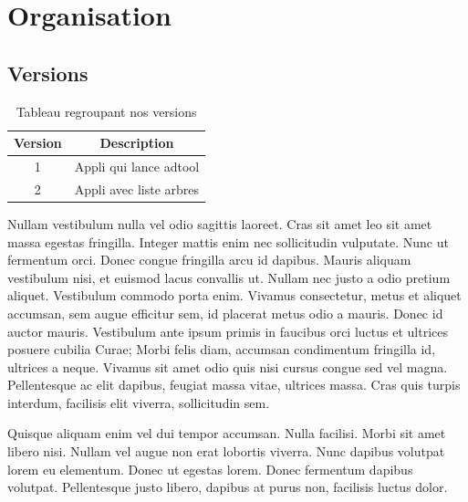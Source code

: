 \section{Organisation}


	\subsection{Versions}
		\begin{table}[h]
			\begin{center}
			\begin{tabular}{|c|c|}
				\hline
				Version & Description\\
				\hline
				1 & Appli qui lance adtool\\
				\hline
				2 & Appli avec liste arbres\\
				\hline
			\end{tabular}
			\end{center}
			\caption{Tableau regroupant nos versions}
		\end{table}

		Nullam vestibulum nulla vel odio sagittis laoreet. Cras sit amet leo sit amet massa egestas fringilla. Integer mattis enim nec sollicitudin vulputate. Nunc ut fermentum orci. Donec congue fringilla arcu id dapibus. Mauris aliquam vestibulum nisi, et euismod lacus convallis ut. Nullam nec justo a odio pretium aliquet. Vestibulum commodo porta enim. Vivamus consectetur, metus et aliquet accumsan, sem augue efficitur sem, id placerat metus odio a mauris. Donec id auctor mauris. Vestibulum ante ipsum primis in faucibus orci luctus et ultrices posuere cubilia Curae; Morbi felis diam, accumsan condimentum fringilla id, ultrices a neque. Vivamus sit amet odio quis nisi cursus congue sed vel magna. Pellentesque ac elit dapibus, feugiat massa vitae, ultrices massa. Cras quis turpis interdum, facilisis elit viverra, sollicitudin sem.

		Quisque aliquam enim vel dui tempor accumsan. Nulla facilisi. Morbi sit amet libero nisi. Nullam vel augue non erat lobortis viverra. Nunc dapibus volutpat lorem eu elementum. Donec ut egestas lorem. Donec fermentum dapibus volutpat. Pellentesque justo libero, dapibus at purus non, facilisis luctus dolor. 

